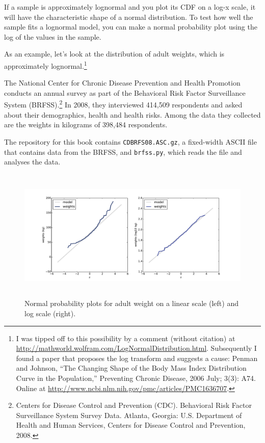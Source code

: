 \documentclass[12pt]{book}
\begin{document}
If a sample is approximately lognormal and you plot its CDF on a
log-x scale, it will have the characteristic shape of a normal
distribution.  To test how well the sample fits a lognormal model, you
can make a normal probability plot using the log of the values
in the sample.

As an example, let's look at the distribution of adult weights, which
is approximately lognormal.\footnote{I was tipped off to this
  possibility by a comment (without citation) at
  \url{http://mathworld.wolfram.com/LogNormalDistribution.html}.
  Subsequently I found a paper that proposes the log transform and
  suggests a cause: Penman and Johnson, ``The Changing Shape of the
  Body Mass Index Distribution Curve in the Population,'' Preventing
  Chronic Disease, 2006 July; 3(3): A74.  Online at
  \url{http://www.ncbi.nlm.nih.gov/pmc/articles/PMC1636707}.}

The National Center for Chronic Disease
Prevention and Health Promotion conducts an annual survey as part of
the Behavioral Risk Factor Surveillance System
(BRFSS).\footnote{Centers for Disease Control and Prevention
  (CDC). Behavioral Risk Factor Surveillance System Survey
  Data. Atlanta, Georgia: U.S. Department of Health and Human
  Services, Centers for Disease Control and Prevention, 2008.}  In
2008, they interviewed 414,509 respondents and asked about their
demographics, health and health risks.
Among the data they collected are the weights in kilograms of
398,484 respondents.

The repository for this book contains {\tt CDBRFS08.ASC.gz},
a fixed-width ASCII file that contains data from the BRFSS,
and {\tt brfss.py}, which reads the file and analyses the data.

\begin{figure}
\centerline{
\includegraphics[height=2.5in]{figs/brfss_weight_normal.pdf}}
\caption{Normal probability plots for adult weight on a linear scale
  (left) and log scale (right).}
\label{brfss_weight_normal}
\end{figure}
\end{document}
